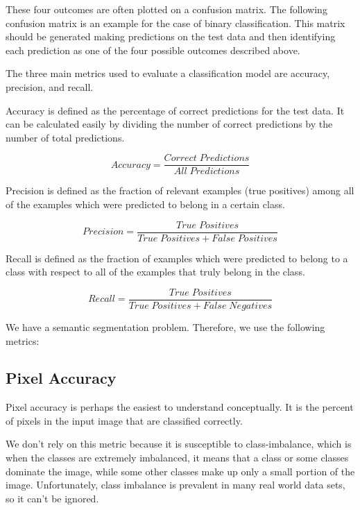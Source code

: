These four outcomes are often plotted on a confusion matrix. The following confusion matrix is an example for the case of binary classification. This matrix should be generated making predictions on the test data and then identifying each prediction as one of the four possible outcomes described above.

\vspace{0.1in}



The three main metrics used to evaluate a classification model are accuracy, precision, and recall.

Accuracy is defined as the percentage of correct predictions for the test data. It can be calculated easily by dividing the number of correct predictions by the number of total predictions.

\begin{equation}
  Accuracy = \frac{Correct\; Predictions}{All\; Predictions}
\end{equation}

Precision is defined as the fraction of relevant examples (true positives) among all of the examples which were predicted to belong in a certain class.

\begin{equation}
  Precision = \frac{True\; Positives}{True\; Positives + False\; Positives}
\end{equation}

Recall is defined as the fraction of examples which were predicted to belong to a class with respect to all of the examples that truly belong in the class.

\begin{equation}
  Recall = \frac{True\; Positives}{True\; Positives + False\; Negatives}
\end{equation}

We have a semantic segmentation problem. Therefore, we use the following metrics:

\subsection{Pixel Accuracy}
\hspace{\parindent}
Pixel accuracy is perhaps the easiest to understand conceptually. It is the percent of pixels in the input image that are classified correctly.\

We don't rely on this metric because it is susceptible to class-imbalance, which is when the classes are extremely imbalanced, it means that a class or some classes dominate the image, while some other classes make up only a small portion of the image. Unfortunately, class imbalance is prevalent in many real world data sets, so it can’t be ignored.\

